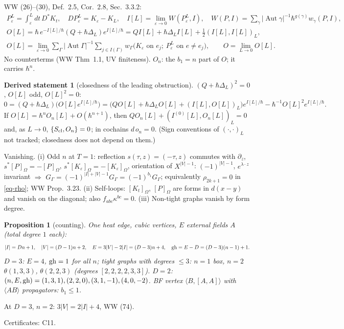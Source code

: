 \documentclass[10pt,a4paper]{article}
\numberwithin{equation}{section}
\newtheorem{proposition}[theorem]{Proposition}
\theoremstyle{definition}
\newtheorem{dstatement}[theorem]{Derived statement}
\theoremstyle{remark}
\newcommand{\Aut}{\operatorname{Aut}}
\newcommand{\cert}[1]{\par\noindent\textup{Certificates: #1.}\par}
\begin{document}
WW \cite{WW} (26)--(30), Def.~2.5, Cor.~2.8, Sec.~3.3.2:
\begin{gather}
P_\varepsilon^L=\int_\varepsilon^Ldt\,D^*K_t,\quad DP_\varepsilon^L=K_\varepsilon-K_L,\quad I[L]=\lim_{\varepsilon\to0}W(P_\varepsilon^L,I),\quad W(P,I)=\sum_\gamma|\Aut\gamma|^{-1}\hbar^{g(\gamma)}w_\gamma(P,I),\\
O[L]=\hbar\,e^{-I[L]/\hbar}(Q+\hbar\Delta_L)e^{I[L]/\hbar}=QI[L]+\hbar\Delta_LI[L]+\tfrac12(I[L],I[L])_L,\\
O[L]=\lim_{\varepsilon\to0}\sum_\Gamma|\Aut\Gamma|^{-1}\sum_{j\in I(\Gamma)}w_\Gamma\big(K_\varepsilon\text{ on }e_j;\ P^L_\varepsilon\text{ on }e\neq e_j\big),\qquad O=\lim_{L\to0}O[L].
\end{gather}
No counterterms (WW Thm~1.1, UV finiteness). $O_n$: the $b_1=n$ part of $O$; it carries $\hbar^n$.

\begin{dstatement}[closedness of the leading obstruction]\label{ds-closed}
$(Q+\hbar\Delta_L)^2=0$, $O[L]$ odd, $O[L]^2=0$:
\begin{equation}
0=(Q+\hbar\Delta_L)\big(O[L]e^{I[L]/\hbar}\big)=\big(QO[L]+\hbar\Delta_LO[L]+(I[L],O[L])_L\big)e^{I[L]/\hbar}-\hbar^{-1}O[L]^2e^{I[L]/\hbar} .
\end{equation}
If $O[L]=\hbar^nO_n[L]+O(\hbar^{n+1})$, then $QO_n[L]+(I^{(0)}[L],O_n[L])_L=0$ and, as $L\to0$, $\{S_{\rm cl},O_n\}=0$; in cochains $d\,o_n=0$. (Sign conventions of $(\cdot,\cdot)_L$ not tracked; closedness does not depend on them.)
\end{dstatement}

Vanishing. (i) Odd $n$ at $T=1$: reflection $s(\tau,z)=(-\tau,z)$ commutes with $\partial_z$, $s^*[P]_\Omega=-[P]_\Omega$, $s^*[K_\varepsilon]_\Omega=-[K_\varepsilon]_\Omega$, orientation of $X^{|V|-1}$: $(-1)^{|V|-1}$, $e^{\lambda\cdot z}$ invariant $\Rightarrow$ $G_\Gamma=(-1)^{|I|+|V|-1}G_\Gamma=(-1)^{b_1}G_\Gamma$; equivalently $\rho_{2k+1}=0$ in \eqref{eq-rho}; WW Prop.~3.23. (ii) Self-loops: $[K_t]_\Omega$, $[P]_\Omega$ are forms in $d(x-y)$ and vanish on the diagonal; also $f_{abc}\kappa^{bc}=0$. (iii) Non-tight graphs vanish by form degree.

\begin{proposition}[counting]\label{prop-count}
One heat edge, cubic vertices, $E$ external fields $A$ (total degree $1$ each):
\begin{equation}
|I|=Dn+1,\quad |V|=(D-1)n+2,\quad E=3|V|-2|I|=(D-3)n+4,\quad {\rm gh}=E-D=(D-3)(n-1)+1 .
\end{equation}
$D=3$: $E=4$, ${\rm gh}=1$ for all $n$; tight graphs with degrees $\le3$: $n=1$ box, $n=2$ $\theta(1,3,3)$, $\theta(2,2,3)$ (degrees $[2,2,2,2,3,3]$). $D=2$: $(n,E,{\rm gh})=(1,3,1),(2,2,0),(3,1,-1),(4,0,-2)$. BF vertex $\langle B,[A,A]\rangle$ with $\langle AB\rangle$ propagators: $b_1\le1$.
\end{proposition}
At $D=3$, $n=2$: $3|V|=2|I|+4$, WW (74).
\cert{C11}
\end{document}
